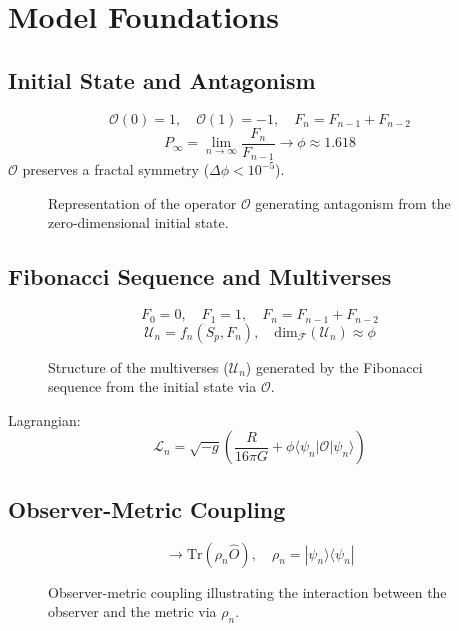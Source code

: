 \documentclass[aps,prl,twocolumn,groupedaddress]{revtex4-2}
\newcommand{\F}[1]{F_{#1}}
\newcommand{\U}[1]{\mathcal{U}_{#1}}
\newcommand{\phiapprox}{\phi \approx 1.618}
\newcommand{\Opp}{\mathcal{O}}
\newcommand{\dimfrac}{\mathrm{dim}_\mathscr{F}}
\begin{document}
\section{Model Foundations}
\subsection{Initial State and Antagonism}
\begin{equation}
\Opp(0) = 1, \quad \Opp(1) = -1, \quad \F{n} = \F{n-1} + \F{n-2}
\label{eq:antagonism}
\end{equation}
\begin{equation}
P_\infty = \lim_{n \to \infty} \frac{\F{n}}{\F{n-1}} \to \phiapprox
\label{eq:paradox}
\end{equation}
\(\Opp\) preserves a fractal symmetry (\(\Delta \phi < 10^{-5}\)).
\begin{figure}
\centering

\caption{Representation of the operator \(\Opp\) generating antagonism from the zero-dimensional initial state.}
\label{fig:opp}
\end{figure}

\subsection{Fibonacci Sequence and Multiverses}
\begin{equation}
\F{0} = 0, \quad \F{1} = 1, \quad \F{n} = \F{n-1} + \F{n-2}
\label{eq:fibonacci}
\end{equation}
\begin{equation}
\U{n} = f_n(S_p, \F{n}), \quad \dimfrac(\U{n}) \approx \phi
\label{eq:univers}
\end{equation}
\begin{figure}
\centering

\caption{Structure of the multiverses (\(\U{n}\)) generated by the Fibonacci sequence from the initial state via \(\Opp\).}
\label{fig:fibonacci}
\end{figure}
Lagrangian:
\begin{equation}
\mathcal{L}_n = \sqrt{-g} \left( \frac{R}{16\pi G} + \phi \langle \psi_n | \Opp | \psi_n \rangle \right)
\label{eq:lagrangian}
\end{equation}

\subsection{Observer-Metric Coupling}
\begin{equation}
\to \text{Tr}(\rho_n \hat{O}), \quad \rho_n = |\psi_n\rangle\langle\psi_n|
\label{eq:doute}
\end{equation}
\begin{figure}
\centering

\caption{Observer-metric coupling illustrating the interaction between the observer and the metric via \(\rho_n\).}
\label{fig:coupling}
\end{figure}
\end{document}
